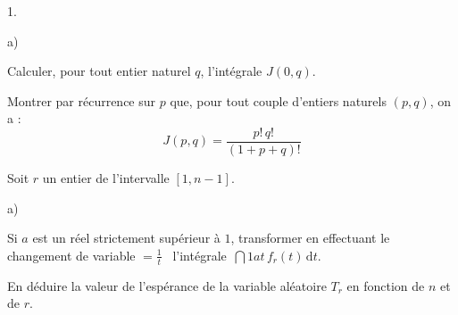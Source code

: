 \documentclass[11pt]{article}%
\begin{document}
\begin{noliste}{1.}
\begin{noliste}{a)}
\item Calculer, pour tout entier naturel $q$, l'intégrale $J(0,q)$.

\item Montrer par récurrence sur $p$ que, pour tout couple d'entiers
naturels $(p,q)$, on a :\vspace{-3mm} 
\[
J(p,q) = \frac{p!\,q!}{(1 + p + q)!}
\]
\end{noliste}

\item Soit $r$ un entier de l'intervalle $[1,n-1]$.

\begin{noliste}{a)}
 \setlength{\itemsep}{2mm}
\item Si $a$ est un réel strictement supérieur à $1$,
transformer en effectuant le changement de variable $ = \frac{1}{t}$ \
l'intégrale\ $\dint{1}{a}t\,f_{r}(t)\,\text{d}t$.

\item En déduire la valeur de l'espérance de la variable aléatoire
$T_{r}$ en fonction de $n$ et de $r$.
\end{noliste}
\end{noliste}
\end{document}
